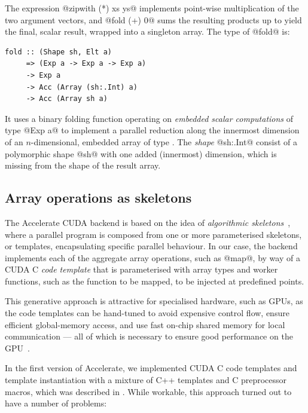 The expression @zipwith (*) xs ys@ implements point-wise multiplication of
the two argument vectors, and @fold (+) 0@ sums the resulting products up
to yield the final, scalar result, wrapped into a singleton array. The type of
@fold@ is:
%
\begin{lstlisting}[style=haskell]
fold :: (Shape sh, Elt a)
     => (Exp a -> Exp a -> Exp a)
     -> Exp a
     -> Acc (Array (sh:.Int) a)
     -> Acc (Array sh a)
\end{lstlisting}
%
It uses a binary folding function operating on \emph{embedded scalar
computations} of type @Exp a@ to implement a parallel reduction along the
innermost dimension of an $n$-dimensional, embedded array of type . The \emph{shape} @sh:.Int@ consist of a polymorphic shape
@sh@ with one added (innermost) dimension, which is missing from the shape
of the result array.


\subsection{Array operations as skeletons}

The Accelerate CUDA backend is based on the idea of \emph{algorithmic
skeletons}~\cite{Cole:1989vr}, where a parallel program is composed from one or
more parameterised skeletons, or templates, encapsulating specific parallel
behaviour. In our case, the backend implements each of the aggregate array
operations, such as @map@, by way of a CUDA C \emph{code template} that is
parameterised with array types and worker functions, such as the function to be
mapped, to be injected at predefined points.

This generative approach is attractive for specialised hardware, such as GPUs,
as the code templates can be hand-tuned to avoid expensive control flow, ensure
efficient global-memory access, and use fast on-chip shared memory for local
communication --- all of which is necessary to ensure good performance on the
GPU~\cite{NVIDIA:2012wf}.

In the first version of Accelerate, we implemented CUDA C code templates and
template instantiation with a mixture of C++ templates and C preprocessor
macros, which was described in \cite{Chakravarty:2011fr}. While workable, this
approach turned out to have a number of problems:

